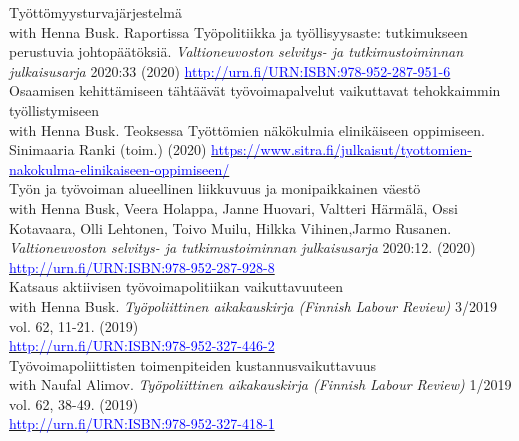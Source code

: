 \documentclass[16pt]{article}
\begin{document}
\noindent Ty\"{o}tt\"{o}myysturvaj\"{a}rjestelm\"{a} \\
\noindent with Henna Busk. Raportissa Ty\"{o}politiikka ja ty\"{o}llisyysaste: tutkimukseen perustuvia johtop\"{a}\"{a}t\"{o}ksi\"{a}. \textit{Valtioneuvoston selvitys- ja tutkimustoiminnan julkaisusarja} 2020:33 (2020) \href{http://urn.fi/URN:ISBN:978-952-287-951-6}{\textcolor{blue}{http://urn.fi/URN:ISBN:978-952-287-951-6}} \\

\noindent Osaamisen kehitt\"{a}miseen t\"{a}ht\"{a}\"{a}v\"{a}t ty\"{o}voimapalvelut vaikuttavat tehokkaimmin ty\"{o}llistymiseen \\
\noindent with Henna Busk. Teoksessa Työttömien näkökulmia elinikäiseen oppimiseen. Sinimaaria Ranki (toim.) (2020) \href{https://www.sitra.fi/julkaisut/tyottomien-nakokulma-elinikaiseen-oppimiseen/}{\textcolor{blue}{https://www.sitra.fi/julkaisut/tyottomien-nakokulma-elinikaiseen-oppimiseen/}} \\

\noindent Ty\"{o}n ja ty\"{o}voiman alueellinen liikkuvuus ja monipaikkainen v\"{a}est\"{o} \\
\noindent with Henna Busk, Veera Holappa, Janne Huovari, Valtteri H\"{a}rm\"{a}l\"{a}, Ossi Kotavaara, Olli Lehtonen, Toivo Muilu, Hilkka Vihinen,Jarmo Rusanen. \textit{Valtioneuvoston selvitys- ja tutkimustoiminnan julkaisusarja} 2020:12. (2020) \href{http://urn.fi/URN:ISBN:978-952-287-928-8}{\textcolor{blue}{http://urn.fi/URN:ISBN:978-952-287-928-8}} \\

\noindent Katsaus aktiivisen ty\"{o}voimapolitiikan vaikuttavuuteen \\
\noindent with Henna Busk. \textit{Ty\"{o}poliittinen aikakauskirja (Finnish Labour Review)} 3/2019 vol. 62, 11-21.  (2019) \\
\noindent \href{http://urn.fi/URN:ISBN:978-952-327-446-2}{\textcolor{blue}{http://urn.fi/URN:ISBN:978-952-327-446-2}} \\

\noindent Ty\"{o}voimapoliittisten toimenpiteiden kustannusvaikuttavuus \\
\noindent with Naufal Alimov. \textit{Ty\"{o}poliittinen aikakauskirja (Finnish Labour Review)} 1/2019 vol. 62, 38-49.  (2019) \\
\noindent \href{http://urn.fi/URN:ISBN:978-952-287-645-4}{\textcolor{blue}{http://urn.fi/URN:ISBN:978-952-327-418-1}} \\
\end{document}
